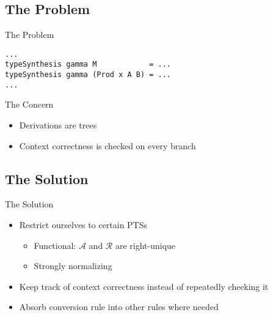 \documentclass{beamer}
\begin{document}
\subsection{The Problem}

\begin{frame}[fragile]{The Problem}


  \smallskip

  \small{\begin{verbatim}
...
typeSynthesis gamma M            = ...
typeSynthesis gamma (Prod x A B) = ...
...
  \end{verbatim}}

\end{frame}


\begin{frame}{The Concern}


  \begin{itemize}
    \item
      Derivations are trees
    \item
      Context correctness is checked on every branch
  \end{itemize}

\end{frame}


\subsection{The Solution}

\begin{frame}{The Solution}

  \begin{itemize}
    \item
      Restrict ourselves to certain PTSs
      \begin{itemize}
        \item Functional: $\mathcal{A}$ and $\mathcal{R}$ are right-unique
        \item Strongly normalizing
      \end{itemize}
    \item
      Keep track of context correctness instead of repeatedly checking it
    \item
      Absorb conversion rule into other rules where needed
  \end{itemize}

\end{frame}
\end{document}
